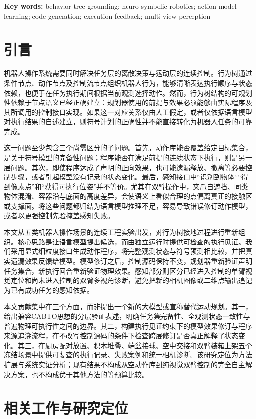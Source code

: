 \documentclass[UTF8,zihao=-4,fontset=fandol,a4paper]{ctexart}
\begin{document}
\noindent\textbf{Key words:} behavior tree grounding; neuro-symbolic robotics; action model learning; code generation; execution feedback; multi-view perception
\endgroup

\section{引言}
机器人操作系统需要同时解决任务层的离散决策与运动层的连续控制。行为树通过条件节点、动作节点及控制流节点组织机器人行为，能够清晰表达执行顺序与状态依赖，也便于在任务执行期间根据当前观测选择动作。然而，行为树结构的可规划性依赖于节点语义已经正确建立：规划器使用的前提与效果必须能够由实际程序及其所调用的控制接口实现。如果这一对应关系仅由人工假定，或者仅依据语言模型对执行结果的自述建立，则符号计划的正确性并不能直接转化为机器人任务的可靠完成。

这一问题至少包含三个尚需区分的子问题。首先，动作库能否覆盖给定目标集合，是关于符号模型的完备性问题；程序能否在满足前提的连续状态下执行，则是另一层问题。其次，即使程序达成了声明的正向效果，也可能遗漏释放、撤离等必要控制步骤，或者引起模型没有记录的状态变化。最后，感知接口中“识别到物体”“得到像素点”和“获得可执行位姿”并不等价。尤其在双臂操作中，夹爪自遮挡、同类物体混淆、容器沿与底面的高度差异，会使语义上看似合理的点偏离真正的接触区或支撑面。将这些问题都归结为语言模型推理不足，容易导致错误修订动作模型，或者以更强控制先验掩盖感知失败。

本文从五类机器人操作场景的连续工程实验出发，对行为树接地过程进行重新组织。核心思路是让语言模型提出候选，而由独立运行时提供可检查的执行见证。我们采用显式细粒度接口生成动作程序，将完整观测状态与符号预测相比较，并把真实遗漏效果反馈给模型。模型修订之后，控制源码保持不变，规划器重新验证声明任务集合，新执行回合重新验证物理效果。感知部分则区分已经进入控制的单臂视觉定位和尚未进入控制的双臂多视角诊断，避免把新的相机图像或二维点输出追记为已有成功任务的感知依据。

本文贡献集中在三个方面，而非提出一个新的大模型或宣称替代运动规划。其一，给出兼容CABTO思想的分层验证表述，明确任务集完备性、全观测状态一致性与普遍物理可执行性之间的边界。其二，构建执行见证约束下的模型效果修订与程序来源追溯流程，在不改写控制源码的条件下检查跨层修订是否真正解释了状态变化。其三，在厨房配对放置、积木堆叠、端盆接球、空中交接和双臂装箱上架五个冻结场景中提供可复查的执行记录、失败案例和统一相机诊断。该研究定位为方法扩展与系统实证分析；现有结果不构成从空动作库到纯视觉双臂控制的完全自主解决方案，也不构成优于其他方法的等预算比较。

\section{相关工作与研究定位}
\end{document}
